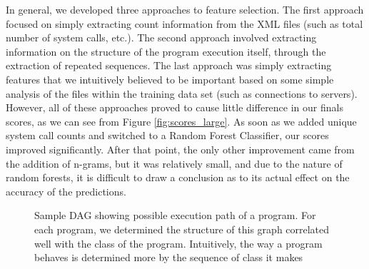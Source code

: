 \documentclass[letterpaper]{article}
\begin{document}
\noindent In general, we developed three approaches to feature selection. The first approach focused on simply extracting count information from the XML files (such as total number of system calls, etc.). The second approach involved extracting information on the structure of the program execution itself, through the extraction of repeated sequences. The last approach was simply extracting features that we intuitively believed to be important based on some simple analysis of the files within the training data set (such as connections to servers). However, all of these approaches proved to cause little difference in our finals scores, as we can see from Figure \ref{fig:scores_large}. As soon as we added unique system call counts and switched to a Random Forest Classifier, our scores improved significantly. After that point, the only other improvement came from the addition of n-grams, but it was relatively small, and due to the nature of random forests, it is difficult to draw a conclusion as to its actual effect on the accuracy of the predictions. 


\begin{figure}[h!]
\centering
{}
\caption{Sample DAG showing possible execution path of a program. For each program, we determined the structure of this graph correlated well with the class of the program. Intuitively, the way a program behaves is determined more by the sequence of class it makes}
\label{fig:dependency_diagram}
\end{figure}
\end{document}
